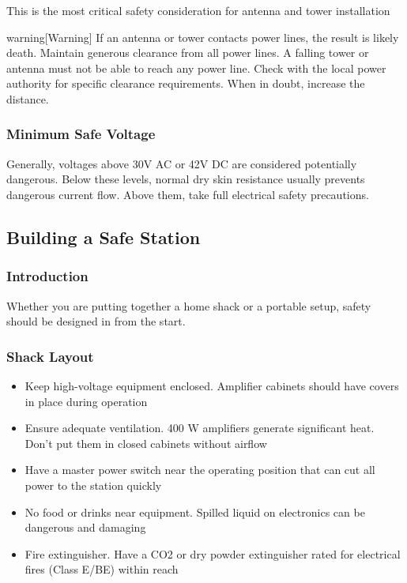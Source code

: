 \documentclass{article}
\begin{document}
This is the most critical safety consideration for antenna and tower installation
\begin{callout}{warning}[Warning]
If an antenna or tower contacts power lines, the result is likely death. Maintain generous clearance from all power lines. A falling tower or antenna must not be able to reach any power line. Check with the local power authority for specific clearance requirements. When in doubt, increase the distance.
\end{callout}

\subsubsection{Minimum Safe Voltage}
Generally, voltages above 30V AC or 42V DC are considered potentially dangerous. Below these levels, normal dry skin resistance usually prevents dangerous current flow. Above them, take full electrical safety precautions.

\subsection{Building a Safe Station}
\subsubsection{Introduction}
Whether you are putting together a home shack or a portable setup, safety should be designed in from the start.

\subsubsection{Shack Layout}
\begin{itemize}
    \item Keep high-voltage equipment enclosed. Amplifier cabinets should have covers in place during operation
    \item Ensure adequate ventilation. 400 W amplifiers generate significant heat. Don't put them in closed cabinets without airflow
    \item Have a master power switch near the operating position that can cut all power to the station quickly
    \item No food or drinks near equipment. Spilled liquid on electronics can be dangerous and damaging
    \item Fire extinguisher. Have a CO2 or dry powder extinguisher rated for electrical fires (Class E/BE) within reach
\end{itemize}
\end{document}
